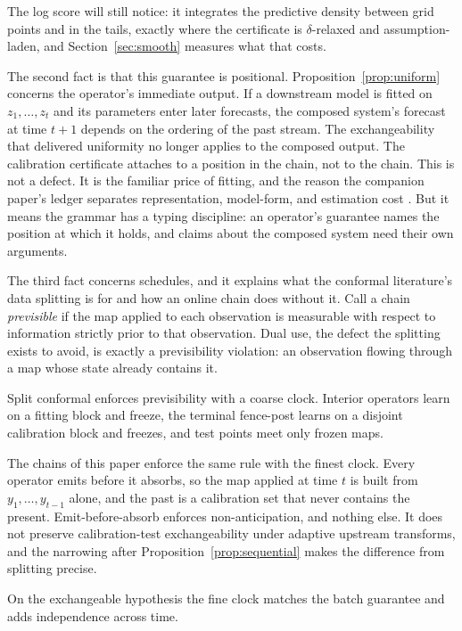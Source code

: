 \documentclass[11pt]{article}
\theoremstyle{remark}
\begin{document}
The log score will still notice: it
integrates the predictive density between grid points and in the tails, exactly where
the certificate is $\delta$-relaxed and assumption-laden, and
Section~\ref{sec:smooth} measures what that costs.

The second fact is that this guarantee is positional. Proposition~\ref{prop:uniform}
concerns the operator's immediate output. If a downstream model is fitted on
$z_1, \dots, z_t$ and its parameters enter later forecasts, the composed system's
forecast at time $t+1$ depends on the ordering of the past stream. The exchangeability
that delivered uniformity no longer applies to the composed output. The calibration certificate
attaches to a position in the chain, not to the chain. This is not a defect. It is the
familiar price of fitting, and the reason the companion paper's ledger separates
representation, model-form, and estimation cost \citep{cotton2026gap}. But it means the
grammar has a typing discipline: an operator's guarantee names the position at which it
holds, and claims about the composed system need their own arguments.

The third fact concerns schedules, and it explains what the conformal literature's data
splitting is for and how an online chain does without it. Call a chain \emph{previsible}
if the map applied to each observation is measurable with respect to information strictly
prior to that observation. Dual use, the defect the splitting exists to avoid, is exactly
a previsibility violation: an observation flowing through a map whose state already
contains it.

Split conformal enforces previsibility with a coarse clock. Interior
operators learn on a fitting block and freeze, the terminal fence-post learns on a
disjoint calibration block and freezes, and test points meet only frozen maps.

The chains
of this paper enforce the same rule with the finest clock. Every operator emits before it
absorbs, so the map applied at time $t$ is built from $y_1, \dots, y_{t-1}$ alone, and
the past is a calibration set that never contains the present. Emit-before-absorb
enforces non-anticipation, and nothing else. It does not preserve calibration-test
exchangeability under adaptive upstream transforms, and the narrowing after
Proposition~\ref{prop:sequential} makes the difference from splitting precise.

On the exchangeable hypothesis the fine clock matches the batch guarantee and adds
independence across time.
\end{document}
